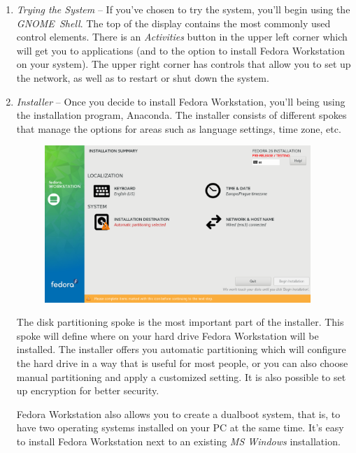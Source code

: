 \begin{enumerate}
\item\emph{Trying the System} -- If you've chosen to try the system, you'll begin using the \emph{GNOME~Shell}. The top of the display contains the most commonly used control elements. There is an \emph{Activities} button in the upper left corner which will get you to applications (and to the option to install Fedora Workstation on your system). The upper right corner has controls that allow you to set up the network, as well as to restart or shut down the system.

\item\emph{Installer} -- Once you decide to install Fedora Workstation, you'll being using the installation program, Anaconda. The installer consists of different spokes that manage the options for areas such as language settings, time zone, etc.

\begin{figure}[ht]
\begin{center}
\includegraphics[width=0.95\textwidth]{img/installer-b}
 \label{fig:installer-b}
\end{center}
\end{figure}

The disk partitioning spoke is the most important part of the installer. This spoke will define where on your hard drive Fedora Workstation will be installed. The installer offers you automatic partitioning which will configure the hard drive in a way that is useful for most people, or you can also choose manual partitioning and apply a customized setting. It is also possible to set up encryption for better security.

Fedora Workstation also allows you to create a dualboot system, that is, to have two operating systems installed on your PC at the same time. It's easy to install Fedora Workstation next to an existing \emph{MS Windows} installation.


\end{enumerate}
